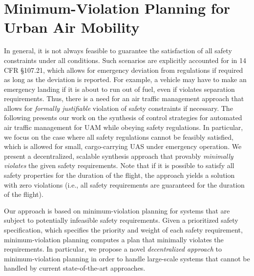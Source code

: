 \chapter{Minimum-Violation Planning for Urban Air Mobility}%
In general, it is not always feasible to guarantee the satisfaction of all safety constraints under all conditions. Such scenarios are explicitly accounted for in 14 CFR \S 107.21, which allows for emergency deviation from regulations if required as long as the deviation is reported. For example, a vehicle may have to make an emergency landing if it is about to run out of fuel, even if violates separation requirements. Thus, there is a need for an air traffic management approach that allows for \emph{formally justifiable} violation of safety constraints if necessary. The following presents our work on the synthesis of control strategies for automated air traffic management for UAM while obeying safety regulations. In particular, we focus on the case where all safety regulations cannot be feasibly satisfied, which is allowed for small, cargo-carrying UAS under emergency operation. We present a decentralized, scalable synthesis approach that provably \emph{minimally violates} the given safety requirements.  Note that if it is possible to satisfy all safety properties for the duration of the flight, the approach yields a solution with zero violations (i.e., all safety requirements are guaranteed for the duration of the flight). 

Our approach is based on minimum-violation planning for systems that are subject to potentially infeasible safety requirements. Given a prioritized safety specification, which specifies the priority and weight of each safety requirement, minimum-violation planning computes a plan that minimally violates the requirements. In particular, we propose a novel \emph{decentralized approach} to minimum-violation planning in order to handle large-scale systems that cannot be handled by current state-of-the-art approaches. 

%
%


%



